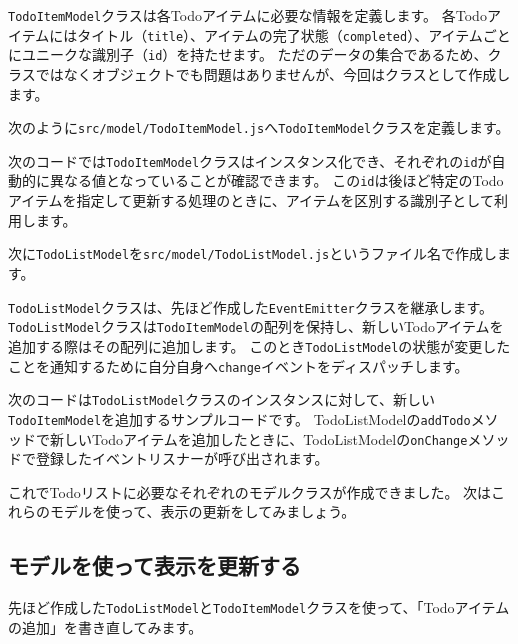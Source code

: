 \texttt{TodoItemModel}クラスは各Todoアイテムに必要な情報を定義します。
各Todoアイテムにはタイトル（\texttt{title}）、アイテムの完了状態（\texttt{completed}）、アイテムごとにユニークな識別子（\texttt{id}）を持たせます。
ただのデータの集合であるため、クラスではなくオブジェクトでも問題はありませんが、今回はクラスとして作成します。

次のように\texttt{src/model/TodoItemModel.js}へ\texttt{TodoItemModel}クラスを定義します。



次のコードでは\texttt{TodoItemModel}クラスはインスタンス化でき、それぞれの\texttt{id}が自動的に異なる値となっていることが確認できます。
この\texttt{id}は後ほど特定のTodoアイテムを指定して更新する処理のときに、アイテムを区別する識別子として利用します。



次に\texttt{TodoListModel}を\texttt{src/model/TodoListModel.js}というファイル名で作成します。

\texttt{TodoListModel}クラスは、先ほど作成した\texttt{EventEmitter}クラスを継承します。
\texttt{TodoListModel}クラスは\texttt{TodoItemModel}の配列を保持し、新しいTodoアイテムを追加する際はその配列に追加します。
このとき\texttt{TodoListModel}の状態が変更したことを通知するために自分自身へ\texttt{change}イベントをディスパッチします。



次のコードは\texttt{TodoListModel}クラスのインスタンスに対して、新しい\texttt{TodoItemModel}を追加するサンプルコードです。
TodoListModelの\texttt{addTodo}メソッドで新しいTodoアイテムを追加したときに、TodoListModelの\texttt{onChange}メソッドで登録したイベントリスナーが呼び出されます。
\newpage


これでTodoリストに必要なそれぞれのモデルクラスが作成できました。
次はこれらのモデルを使って、表示の更新をしてみましょう。

\hypertarget{model-update-view}{%
\subsection{モデルを使って表示を更新する}\label{model-update-view}}

先ほど作成した\texttt{TodoListModel}と\texttt{TodoItemModel}クラスを使って、「Todoアイテムの追加」を書き直してみます。

